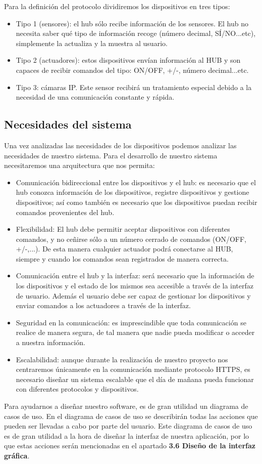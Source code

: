 Para la definición del protocolo dividiremos los dispositivos en tres tipos:
\begin{itemize}
\setlength\itemsep{6pt plus 1pt minus 1pt}
\item Tipo 1 (sensores): el hub sólo recibe información de los sensores. El hub no necesita saber qué tipo de información recoge (número decimal, SÍ/NO...etc), simplemente la actualiza y la muestra al usuario.
\item Tipo 2 (actuadores): estos dispositivos envían información al HUB y son capaces de recibir comandos del tipo: ON/OFF, +/-, número decimal...etc.
\item Tipo 3: cámaras IP. Este sensor recibirá un tratamiento especial debido a la necesidad de una comunicación constante y rápida.
\end{itemize}
\subsection{Necesidades del sistema}
Una vez analizadas las necesidades de los dispositivos podemos analizar las necesidades de nuestro sistema.
Para el desarrollo de nuestro sistema necesitaremos una arquitectura que nos permita:
\begin{itemize}
\setlength\itemsep{6pt plus 1pt minus 1pt}
\item Comunicación bidireccional entre los dispositivos y el hub: es necesario que el hub conozca información de los dispositivos, 
registre dispositivos y gestione dispositivos; así como también es necesario que los dispositivos puedan recibir comandos provenientes
del hub.
\item Flexibilidad: El hub debe permitir aceptar dispositivos con diferentes comandos, y no ceñirse sólo a un número cerrado de comandos (ON/OFF, +/-,...).
De esta manera cualquier actuador podrá conectarse al HUB, siempre y cuando los comandos sean registrados de manera correcta.
\item Comunicación entre el hub y la interfaz: será necesario que la información de los dispositivos y el estado de los mismos sea accesible
a través de la interfaz de usuario. Además el usuario debe ser capaz de gestionar los dispositivos y enviar comandos a los actuadores
a través de la interfaz.
\item Seguridad en la comunicación: es imprescindible que toda comunicación se realice de manera segura, de tal manera que nadie pueda modificar o
acceder a nuestra información.
\item Escalabilidad: aunque durante la realización de nuestro proyecto nos centraremos únicamente en la comunicación mediante protocolo HTTPS, 
es necesario diseñar un sistema escalable que el día de mañana pueda funcionar con diferentes protocolos y dispositivos.
\end{itemize}
Para ayudarnos a diseñar nuestro software, es de gran utilidad un diagrama de casos de uso. En el diagrama de casos de uso se describirán
todas las acciones que pueden ser llevadas a cabo por parte del usuario. Este diagrama de casos de uso es de gran utilidad a la hora de diseñar
la interfaz de nuestra aplicación, por lo que estas acciones serán mencionadas en el apartado \textbf{3.6 Diseño de la interfaz gráfica}.
